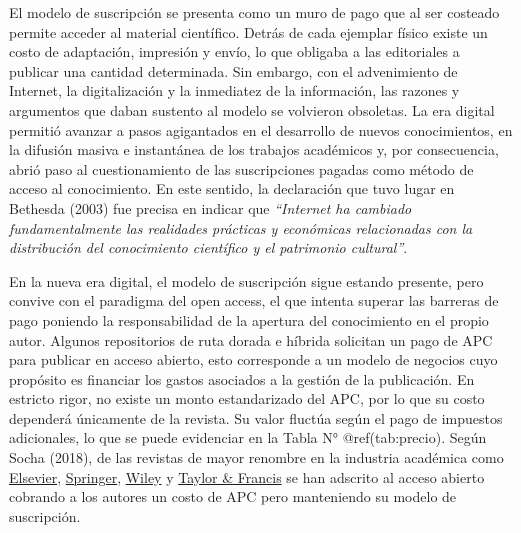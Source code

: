 \documentclass[
  spanish,
  letterpaper,
  DIV=11,
  numbers=noendperiod]{scrreprt}
\begin{document}
El modelo de suscripción se presenta como un muro de pago que al ser
costeado permite acceder al material científico. Detrás de cada ejemplar
físico existe un costo de adaptación, impresión y envío, lo que obligaba
a las editoriales a publicar una cantidad determinada. Sin embargo, con
el advenimiento de Internet, la digitalización y la inmediatez de la
información, las razones y argumentos que daban sustento al modelo se
volvieron obsoletas. La era digital permitió avanzar a pasos agigantados
en el desarrollo de nuevos conocimientos, en la difusión masiva e
instantánea de los trabajos académicos y, por consecuencia, abrió paso
al cuestionamiento de las suscripciones pagadas como método de acceso al
conocimiento. En este sentido, la declaración que tuvo lugar en Bethesda
(2003) fue precisa en indicar que \emph{``Internet ha cambiado
fundamentalmente las realidades prácticas y económicas relacionadas con
la distribución del conocimiento científico y el patrimonio cultural''}.

En la nueva era digital, el modelo de suscripción sigue estando
presente, pero convive con el paradigma del open access, el que intenta
superar las barreras de pago poniendo la responsabilidad de la apertura
del conocimiento en el propio autor. Algunos repositorios de ruta dorada
e híbrida solicitan un pago de APC para publicar en acceso abierto, esto
corresponde a un modelo de negocios cuyo propósito es financiar los
gastos asociados a la gestión de la publicación. En estricto rigor, no
existe un monto estandarizado del APC, por lo que su costo dependerá
únicamente de la revista. Su valor fluctúa según el pago de impuestos
adicionales, lo que se puede evidenciar en la Tabla N° @ref(tab:precio).
Según Socha (2018), de las revistas de mayor renombre en la industria
académica como \href{https://www.elsevier.com/open-science}{Elsevier},
\href{https://www.springer.com/la/open-access}{Springer},
\href{https://authorservices.wiley.com/author-resources/Journal-Authors/open-access/index.html}{Wiley}
y
\href{https://authorservices.taylorandfrancis.com/publishing-open-access/}{Taylor
\& Francis} se han adscrito al acceso abierto cobrando a los autores un
costo de APC pero manteniendo su modelo de suscripción.
\end{document}
